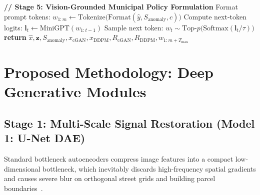 \documentclass[journal]{IEEEtran}
\begin{document}
\begin{algorithm}[!t]
\begin{algorithmic}[1]
\STATE \textbf{// Stage 5: Vision-Grounded Municipal Policy Formulation}
\STATE Format prompt tokens: $w_{1:m} \leftarrow \text{Tokenize}\big(\text{Format}(\hat{y}, S_{\text{anomaly}}, c)\big)$
    \STATE Compute next-token logits: $\mathbf{l}_t \leftarrow \text{MiniGPT}(w_{1:t-1})$
    \STATE Sample next token: $w_t \sim \text{Top-}p\big(\text{Softmax}(\mathbf{l}_t / \tau)\big)$
\ENDFOR
\STATE \textbf{return} $\hat{x}, \mathbf{z}, S_{\text{anomaly}}, x_{\text{cGAN}}, x_{\text{DDPM}}, R_{\text{cGAN}}, R_{\text{DDPM}}, w_{1:m+T_{\text{max}}}$
\end{algorithmic}
\end{algorithm}

\section{Proposed Methodology: Deep Generative Modules}

\subsection{Stage 1: Multi-Scale Signal Restoration (Model 1: U-Net DAE)}
Standard bottleneck autoencoders compress image features into a compact low-dimensional bottleneck, which inevitably discards high-frequency spatial gradients and causes severe blur on orthogonal street grids and building parcel boundaries~\cite{vincent2008extracting,zhang2017beyond}.
\end{document}
